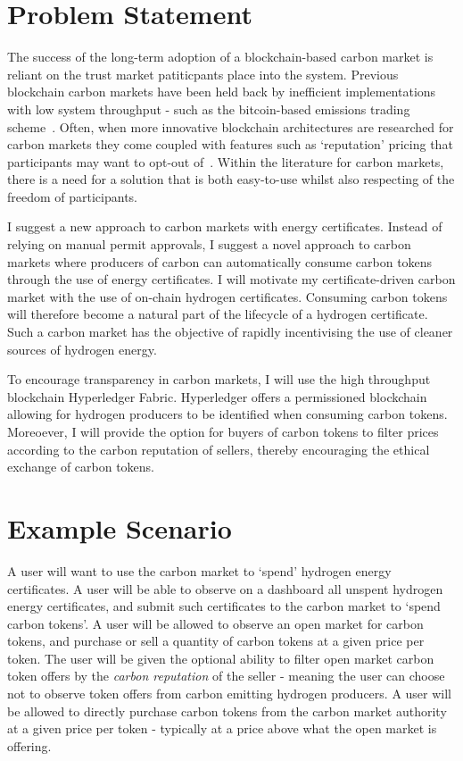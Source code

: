 \section{Problem Statement}

The success of the long-term adoption of a blockchain-based carbon
market is reliant on the trust market patiticpants place into the
system. Previous blockchain carbon markets have been held back by
inefficient implementations with low system throughput - such as
the bitcoin-based emissions trading scheme~\cite{vic15}. Often, when
more innovative blockchain architectures are researched for carbon markets
they come coupled with features such as `reputation' pricing that
participants may want to opt-out of~\cite{KHAQQI20188}. Within the
literature for carbon markets, there is a need for a solution that is
both easy-to-use whilst also respecting of the freedom of participants.

I suggest a new approach to carbon markets with energy certificates.
Instead of relying on manual permit approvals, I suggest a novel approach
to carbon markets where producers of carbon can automatically consume
carbon tokens through the use of energy certificates. I will motivate
my certificate-driven carbon market with the use of on-chain
hydrogen certificates. Consuming carbon tokens will therefore become
a natural part of the lifecycle of a hydrogen certificate. Such a
carbon market has the objective of rapidly incentivising the use of
cleaner sources of hydrogen energy.

To encourage transparency in carbon markets, I will use the high throughput
blockchain Hyperledger Fabric. Hyperledger offers a permissioned
blockchain allowing for hydrogen producers to be identified when consuming
carbon tokens. Moreoever, I will provide the option for buyers of
carbon tokens to filter prices according to the carbon reputation of
sellers, thereby encouraging the ethical exchange of carbon tokens.

\section{Example Scenario}

A user will want to use the carbon market to `spend' hydrogen energy
certificates. A user will be able to observe on a dashboard all unspent
hydrogen energy certificates, and submit such certificates to the
carbon market to `spend carbon tokens'. A user will be allowed to
observe an open market for carbon tokens, and purchase or sell a quantity of
carbon tokens at a given price per token. The user will be given the
optional ability to filter open market carbon token offers by the
\textit{carbon reputation} of the seller - meaning the user can choose not
to observe token offers from carbon emitting hydrogen producers. A user
will be allowed to directly purchase carbon tokens from the carbon market
authority at a given price per token - typically at a price above what the
open market is offering.

